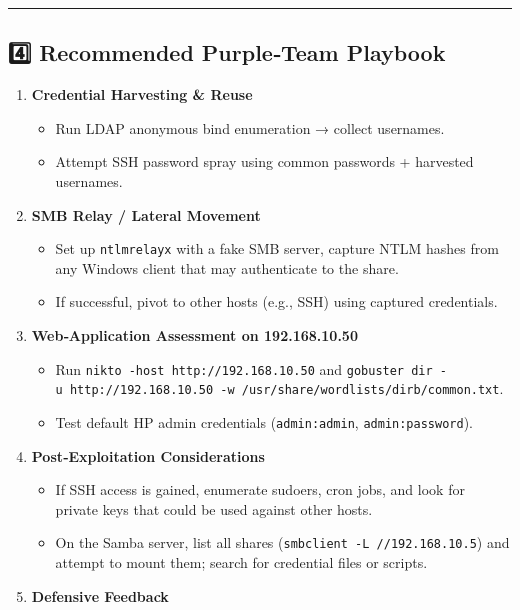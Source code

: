 \begin{center}
            \rule{0.5\linewidth}{0.5pt}
\end{center}

\subsection{4️⃣ Recommended Purple‑Team
Playbook}\label{recommended-purpleteam-playbook}

\begin{enumerate}
    \def\labelenumi{\arabic{enumi}.}
    \tightlist
    \item
    \textbf{Credential Harvesting \& Reuse}

    \begin{itemize}
        \tightlist
        \item
        Run LDAP anonymous bind enumeration → collect usernames.
        \item
        Attempt SSH password spray using common passwords + harvested
        usernames.
    \end{itemize}
    \item
    \textbf{SMB Relay / Lateral Movement}

    \begin{itemize}
        \tightlist
        \item
        Set up \texttt{ntlmrelayx} with a fake SMB server, capture NTLM
        hashes from any Windows client that may authenticate to the share.
        \item
        If successful, pivot to other hosts (e.g., SSH) using captured
        credentials.
    \end{itemize}
    \item
    \textbf{Web‑Application Assessment on 192.168.10.50}

    \begin{itemize}
        \tightlist
        \item
        Run \texttt{nikto\ -host\ http://192.168.10.50} and
        \texttt{gobuster\ dir\ -u\ http://192.168.10.50\ -w\ /usr/share/wordlists/dirb/common.txt}.
        \item
        Test default HP admin credentials (\texttt{admin:admin},
        \texttt{admin:password}).
    \end{itemize}
    \item
    \textbf{Post‑Exploitation Considerations}

    \begin{itemize}
        \tightlist
        \item
        If SSH access is gained, enumerate sudoers, cron jobs, and look for
        private keys that could be used against other hosts.
        \item
        On the Samba server, list all shares
        (\texttt{smbclient\ -L\ //192.168.10.5}) and attempt to mount them;
        search for credential files or scripts.
    \end{itemize}
    \item
    \textbf{Defensive Feedback}


\end{enumerate}
